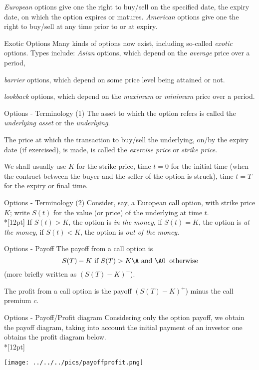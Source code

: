 	{\it European} options give one the right to buy/sell on the
	specified date, the expiry date, on which the option expires or
	matures. {\it American} options give one the right to buy/sell at any time
	prior to or at expiry.


Exotic Options
	Many kinds of options now exist, including so-called {\it exotic}
	options.  Types include:
		{\it Asian} options, which depend on the {\it average} price over a period,
		
		{\it barrier} options, which depend on some price level being attained or not.
		
		{\it lookback} options, which depend on the  {\it maximum} or {\it minimum} price over a period.


Options - Terminology (1)
	The asset to which the option refers is called the {\it underlying
	asset} or the {\it underlying}. 
 
	The price at which the transaction
	to buy/sell the underlying, on/by the expiry date (if exercised),
	is made, is called the {\it exercise price} or {\it strike price}.
	
	We shall usually use $K$ for the strike price, time $t = 0$ for
	the initial time (when the contract between the buyer and the
	seller of the option is struck), time $t = T$ for the expiry or
	final time.


Options - Terminology (2)
	Consider, say, a European call option, with strike price $K$;
	write $S(t)$ for the value (or price) of the underlying at time
	$t$.\\*[12pt]
		If $S(t) > K$, the option is {\it in the money},
		if $S(t) = K$, the option is {\it at the money},
		if $S(t) < K$, the option is {\it out of the money}.


Options - Payoff
	The payoff from a call option is $$ S(T) - K \mbox{ if } S(T)
	> K\A \mbox{ and }\A 0 \;\; \mbox{otherwise} $$ (more briefly
	written as  $(S(T) - K)^+$).
	
	The profit from a call option is the payoff $(S(T) - K)^+$) minus the call premium $c$.


Options - Payoff/Profit diagram 
	Considering only the option payoff, we obtain the payoff diagram, taking into account the initial payment of an investor one obtains the profit diagram below.\\*[12pt]

	\begin{center}
	\texttt{[image: ../../../pics/payoffprofit.png]}
	\end{center}


